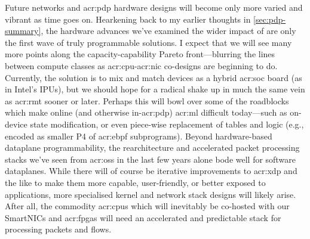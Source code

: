 

Future networks and \gls{acr:pdp} hardware designs will become only more varied and vibrant as time goes on.
Hearkening back to my earlier thoughts in \cref{sec:pdp-summary}, the hardware advances we've examined the wider impact of are only the first wave of truly programmable solutions.
I expect that we will see many more points along the capacity-capability Pareto front---blurring the lines between compute classes as \gls{acr:cpu}-\gls{acr:nic} co-designs are beginning to do.
Currently, the solution is to mix and match devices as a hybrid \gls{acr:soc} board (as in Intel's IPUs), but we should hope for a radical shake up in much the same vein as \gls{acr:rmt} sooner or later.
Perhaps this will bowl over some of the roadblocks which make online (and otherwise in-\gls{acr:pdp}) \gls{acr:ml} difficult today---such as on-device state modification, or even piece-wise replacement of tables and logic (e.g., encoded as smaller P4 of \gls{acr:ebpf} subprograms).
Beyond hardware-based dataplane programmability, the rearchitecture and accelerated packet processing stacks we've seen from \glspl{acr:os} in the last few years alone bode well for software dataplanes.
While there will of course be iterative improvements to \gls{acr:xdp} and the like to make them more capable, user-friendly, or better exposed to applications, more specialised kernel and network stack designs will likely arise.
After all, the commodity \glspl{acr:cpu} which will inevitably be co-hosted with our SmartNICs and \glspl{acr:fpga} will need an accelerated and predictable stack for processing packets and flows.
